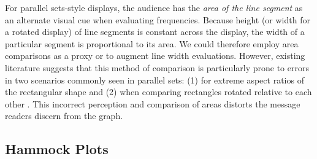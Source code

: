 \documentclass[journal]{vgtc}\usepackage{graphicx, color}
\begin{document}
For parallel sets-style displays, the audience has the {\it area of the line segment} as an alternate visual cue when evaluating frequencies. Because height (or width for a rotated display) of  line segments is constant across the display, the width of a particular  segment is proportional to its area. We could therefore employ area comparisons as a proxy or to augment line width evaluations. 
However, existing literature suggests that this method of comparison is particularly  prone to errors in two scenarios commonly seen in parallel sets: (1) for extreme aspect ratios of the rectangular shape \citep{heer:2010} %
and (2) when comparing rectangles rotated relative to each other \citep{kong:2010}. 
This incorrect perception and comparison of areas distorts the message readers discern from the graph. %


\subsection{Hammock Plots}
\end{document}
